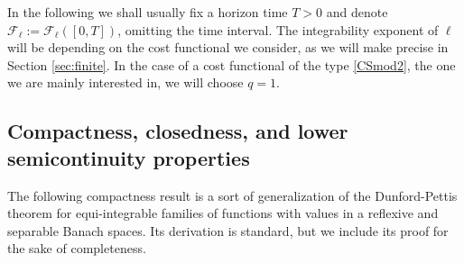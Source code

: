\documentclass[11pt]{article}
\theoremstyle{plain}
\theoremstyle{definition}
\theoremstyle{remark}
\numberwithin{equation}{section}
\begin{document}
In the following we shall usually fix a horizon time $T>0$ and denote $\mathcal F_\ell:=\mathcal F_\ell([0,T])$, omitting the time interval. The integrability exponent of $\ell$ will be depending on the cost functional we consider, as we will make precise in Section \ref{sec:finite}. In the case of a cost functional of the type \eqref{CSmod2}, the one we are mainly interested in, we will choose $q=1$.

\subsection{Compactness, closedness, and lower semicontinuity properties}


The following compactness result is a sort of generalization of the Dunford-Pettis theorem \cite[Theorem 1.38]{AFP00} for equi-integrable families
of functions with values in a reflexive and separable Banach spaces. Its derivation is standard, but we include its proof for the
sake of completeness.
\end{document}
